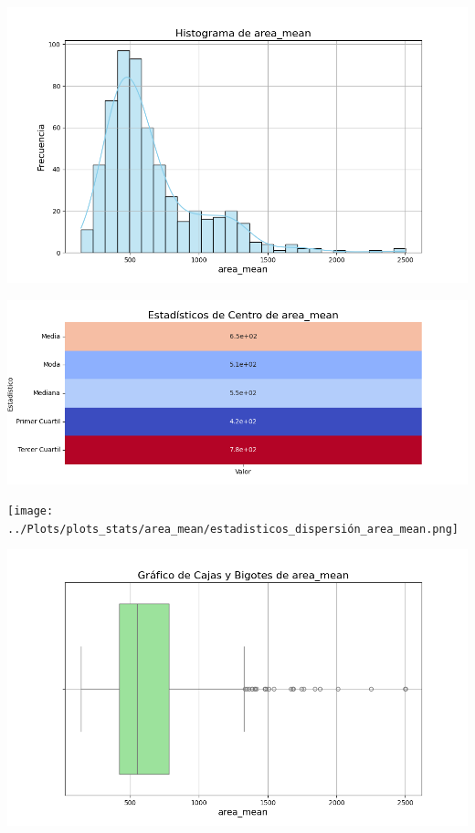 \documentclass[a4paper, 12pt]{article}
\begin{document}
	\includegraphics[width=\textwidth]{../Plots/plots_stats/area_mean/histograma_area_mean.png}




\includegraphics[width=\textwidth]{../Plots/plots_stats/area_mean/estadisticas_centro_area_mean.png}




\texttt{[image: ../Plots/plots\_stats/area\_mean/estadisticos\_dispersión\_area\_mean.png]}



\includegraphics[width=\textwidth]{../Plots/plots_stats/area_mean/boxplot_area_mean.png}
\end{document}
